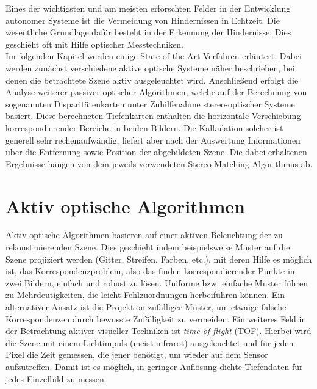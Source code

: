 Eines der wichtigsten und am meisten erforschten Felder in der Entwicklung autonomer Systeme ist die Vermeidung von Hindernissen in Echtzeit. Die wesentliche Grundlage dafür besteht in der Erkennung der Hindernisse. Dies geschieht oft mit Hilfe optischer Messtechniken.\\

\noindent
Im folgenden Kapitel werden einige State of the Art Verfahren erläutert. Dabei werden zunächst verschiedene aktive optische Systeme näher beschrieben, bei denen die betrachtete Szene aktiv ausgeleuchtet wird. Anschließend erfolgt die Analyse weiterer passiver optischer Algorithmen, welche auf der Berechnung von sogenannten Disparitätenkarten unter Zuhilfenahme stereo-optischer Systeme basiert. Diese berechneten Tiefenkarten enthalten die horizontale Verschiebung korrespondierender Bereiche in beiden Bildern. Die Kalkulation solcher ist generell sehr rechenaufwändig, liefert aber nach der Auswertung Informationen über die Entfernung sowie Position der abgebildeten Szene. Die dabei erhaltenen Ergebnisse hängen von dem jeweils verwendeten Stereo-Matching Algorithmus ab.

\section{Aktiv optische Algorithmen}
\label{sec:kamera_basierte_he}
Aktiv optische Algorithmen basieren auf einer aktiven Beleuchtung der zu rekonstruierenden Szene. Dies geschieht indem beispielsweise Muster auf die Szene projiziert werden (Gitter, Streifen, Farben, etc.), mit deren Hilfe es möglich ist, das Korrespondenzproblem, also das finden korrespondierender Punkte in zwei Bildern, einfach und robust zu lösen. Uniforme bzw. einfache Muster führen zu Mehrdeutigkeiten, die leicht Fehlzuordnungen herbeiführen können. Ein alternativer Ansatz ist die Projektion zufälliger Muster, um etwaige falsche Korrespondenzen durch bewusste Zufälligkeit zu vermeiden. Ein weiteres Feld in der Betrachtung aktiver visueller Techniken ist \emph{time of flight} (TOF). Hierbei wird die Szene mit einem Lichtimpuls (meist infrarot) ausgeleuchtet und für jeden Pixel die Zeit gemessen, die jener benötigt, um wieder auf dem Sensor aufzutreffen. Damit ist es möglich, in geringer Auflösung dichte Tiefendaten für jedes Einzelbild zu messen.\\

